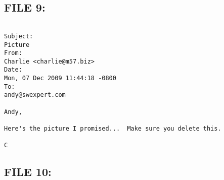 \subsection{FILE 9:}
\label{sec:charlie_daten_9}

\begin{lstlisting}

Subject:
Picture
From:
Charlie <charlie@m57.biz>
Date:
Mon, 07 Dec 2009 11:44:18 -0800
To:
andy@swexpert.com

Andy,

Here's the picture I promised...  Make sure you delete this.

C

\end{lstlisting}

\subsection{FILE 10:}
\label{sec:charlie_daten_10}

